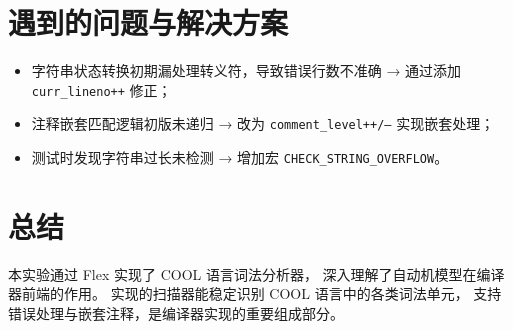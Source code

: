 \documentclass[a4paper,12pt]{article}
\begin{document}
\section{遇到的问题与解决方案}
\begin{itemize}
    \item 字符串状态转换初期漏处理转义符，导致错误行数不准确 → 通过添加 \texttt{curr\_lineno++} 修正；
    \item 注释嵌套匹配逻辑初版未递归 → 改为 \texttt{comment\_level++/--} 实现嵌套处理；
    \item 测试时发现字符串过长未检测 → 增加宏 \texttt{CHECK\_STRING\_OVERFLOW}。
\end{itemize}

\section{总结}
本实验通过 Flex 实现了 COOL 语言词法分析器，
深入理解了自动机模型在编译器前端的作用。
实现的扫描器能稳定识别 COOL 语言中的各类词法单元，
支持错误处理与嵌套注释，是编译器实现的重要组成部分。

\appendix
\end{document}

